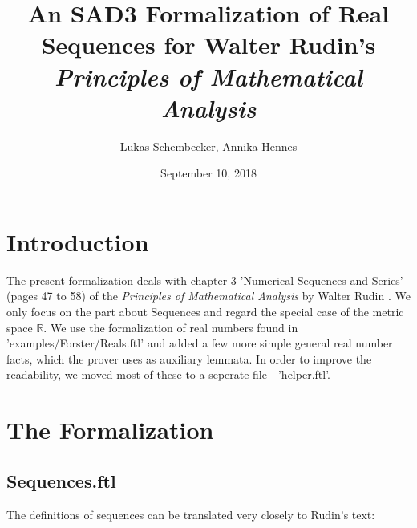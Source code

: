 \documentclass{article}
\begin{document}
\title{An SAD3 Formalization of Real Sequences for Walter Rudin's
\it{Principles of Mathematical Analysis}}

\author{Lukas Schembecker, Annika Hennes}

\date{September 10, 2018}

\maketitle


\section{Introduction}
The present formalization deals with chapter 3 'Numerical Sequences and Series' (pages 47 to 58) of the {\it Principles of Mathematical Analysis} by Walter \linebreak Rudin \cite{Rudin}. We only focus on the part about Sequences and regard the special case of the metric space $\mathbb{R}$. We use the formalization of real numbers found in 'examples/Forster/Reals.ftl' and added a few more simple general real number facts, which the prover uses as auxiliary lemmata. In order to improve the readability, we moved most of these to a seperate file - 'helper.ftl'.

\section{The Formalization}
\subsection{Sequences.ftl}

The definitions of sequences can be translated very closely to Rudin's text:
\end{document}

